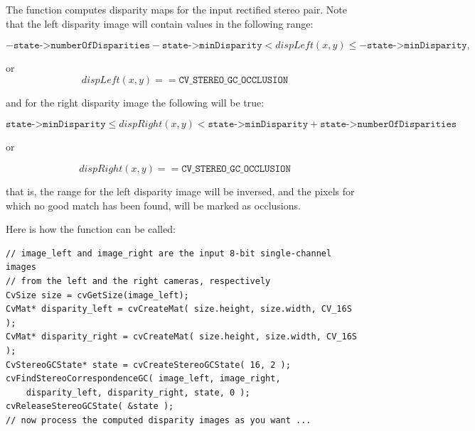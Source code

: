 \begin{description}
\end{description}

The function computes disparity maps for the input rectified stereo pair. Note that the left disparity image will contain values in the following range: 

\[
-\texttt{state->numberOfDisparities}-\texttt{state->minDisparity}
< dispLeft(x,y) \le -\texttt{state->minDisparity},
\]

or
\[
dispLeft(x,y) == \texttt{CV\_STEREO\_GC\_OCCLUSION}
\]

and for the right disparity image the following will be true: 

\[
\texttt{state->minDisparity} \le dispRight(x,y) 
< \texttt{state->minDisparity} + \texttt{state->numberOfDisparities}
\]

or

\[
dispRight(x,y) == \texttt{CV\_STEREO\_GC\_OCCLUSION}
\]

that is, the range for the left disparity image will be inversed,
and the pixels for which no good match has been found, will be marked
as occlusions.

Here is how the function can be called:

\begin{lstlisting}
// image_left and image_right are the input 8-bit single-channel images
// from the left and the right cameras, respectively
CvSize size = cvGetSize(image_left);
CvMat* disparity_left = cvCreateMat( size.height, size.width, CV_16S );
CvMat* disparity_right = cvCreateMat( size.height, size.width, CV_16S );
CvStereoGCState* state = cvCreateStereoGCState( 16, 2 );
cvFindStereoCorrespondenceGC( image_left, image_right,
    disparity_left, disparity_right, state, 0 );
cvReleaseStereoGCState( &state );
// now process the computed disparity images as you want ...
\end{lstlisting}

